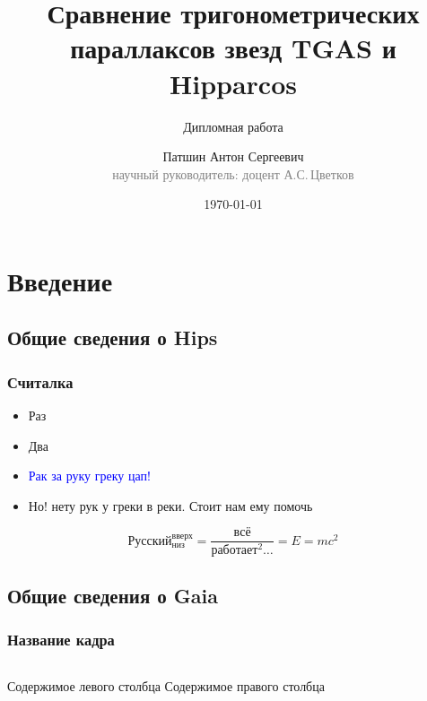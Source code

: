 \documentclass[14pt,aspectratio=43]{beamer}
\begin{document}
\title{Сравнение тригонометрических параллаксов звезд TGAS и Hipparcos}
\subtitle[Диплом]{Дипломная работа}
\author[А.С.\,Патшин]{Патшин Антон Сергеевич\\{\footnotesize\textcolor{gray}{научный руководитель: доцент А.С.\,Цветков}}}
\date{\today} 





\maketitle

\section{Введение}
\subsection{Общие сведения о Hips}
\label{sub:smthhip}
\begin{frame}\frametitle{Считалка} 

  \begin{itemize}
  \item Раз
  \item Два
  \item {\Large \textcolor{blue}{Рак за руку греку цап!}}
  \item Но! нету рук у греки в реки. Стоит нам ему помочь
  \end{itemize}
\begin{equation}
    Русский_{низ}^{вверх} = \frac{всё}{работает^2\dots} = E = m c^2
\end{equation}
\end{frame}


\subsection{Общие сведения о Gaia}
\label{sub:smthgaia}
\begin{frame}\frametitle{Название кадра}

 	\begin{columns}
 			Содержимое левого столбца
 			Содержимое правого столбца
 	\end{columns}
\end{frame}
\end{document}
